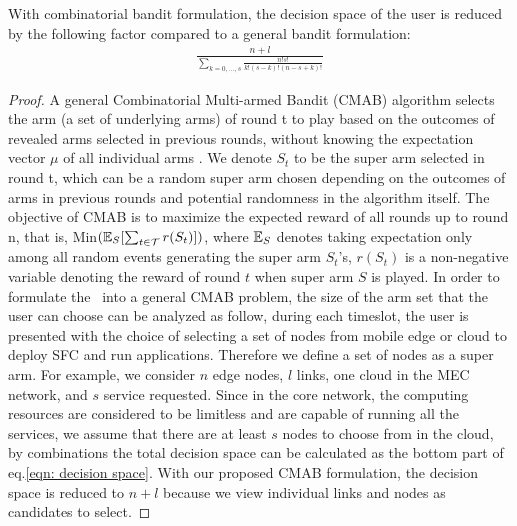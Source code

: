 \begin{theorem}
	With combinatorial bandit formulation, the decision space of the user is reduced by the following factor compared to a general bandit formulation:
	\begin{gather}
		\label{eqn: decision space}
		\frac
		{n + l}
		{\sum_{k = 0,...,s} \frac{n!s!}{k!(s-k)!(n-s+k)!}}
	\end{gather}
	
\end{theorem}
\begin{proof}
	A general Combinatorial Multi-armed Bandit (CMAB) algorithm selects the arm (a set of underlying arms) of round t to play based on the outcomes of revealed arms selected in previous rounds, without knowing the expectation vector $\mu$ of all individual arms \cite{chen2013combinatorial}. 
	We denote $S_t$ to be the super arm selected in round t, which can be a random super arm chosen depending on the outcomes of arms in previous rounds and potential randomness in the algorithm itself. 
	The objective of CMAB is to maximize the expected reward of all rounds up to round n, that is, Min$(\operatorname{\mathbb{E}}_S[\sum_{t\in\mathcal{T}} r(S_t)])$, where $\operatorname{\mathbb{E}}_S$ denotes taking expectation only among all random events generating the super arm $ S_t$'s, $r(S_t)$ is a non-negative variable denoting the reward of round $t$ when super arm $S$ is played.
	In order to formulate the \myproblem\ into a general CMAB problem, the size of the arm set that the user can choose can be analyzed as follow, during each timeslot, the user is presented with the choice of selecting a set of nodes from mobile edge or cloud to deploy SFC and run applications. Therefore we define a set of nodes as a super arm. For example, we consider $n$ edge nodes, $l$ links, one cloud in the MEC network, and $s$ service requested. Since in the core network, the computing resources are considered to be limitless and are capable of running all the services, we assume that there are at least $s$ nodes to choose from in the cloud, by combinations the total decision space can be calculated as the bottom part of eq.\ref{eqn: decision space}. With our proposed CMAB formulation, the decision space is reduced to $n + l$ because we view individual links and nodes as candidates to select.  
\end{proof}

